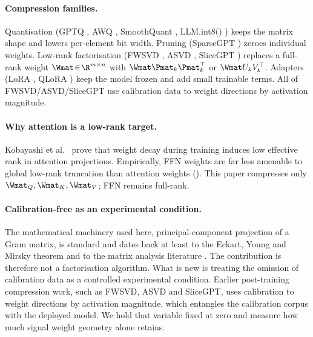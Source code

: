 \documentclass[11pt]{article}
\begin{document}
\paragraph{Compression families.}
Quantisation (GPTQ \cite{frantar2022gptq}, AWQ \cite{lin2023awq},
SmoothQuant \cite{xiao2022smoothquant}, LLM.int8() \cite{dettmers2022llmint8})
keeps the matrix shape and lowers per-element bit width.  Pruning
(SparseGPT \cite{frantar2023sparsegpt}) zeroes individual weights.
Low-rank factorisation (FWSVD \cite{hsu2022fwsvd}, ASVD
\cite{yuan2023asvd}, SliceGPT \cite{ashkboos2024slicegpt}) replaces a
full-rank weight $\Wmat\!\in\!\R^{m\times n}$ with $\Wmat\Pmat_k\Pmat_k^\top$
or $\Wmat U_kV_k^\top$.  Adapters (LoRA \cite{hu2021lora},
QLoRA \cite{dettmers2023qlora}) keep the model frozen and add small
trainable terms.  All of FWSVD/ASVD/SliceGPT use calibration data to
weight directions by activation magnitude.

\paragraph{Why attention is a low-rank target.}
Kobayashi et al.\ \cite{kobayashi2024lowrankattn} prove that weight decay
during training induces low effective rank in attention projections.
Empirically, FFN weights are far less amenable to global low-rank truncation
than attention weights ().  This paper compresses only
$\Wmat_Q,\Wmat_K,\Wmat_V$; FFN remains full-rank.

\paragraph{Calibration-free as an experimental condition.}
The mathematical machinery used here, principal-component projection of a
Gram matrix, is standard and dates back at least to the
Eckart, Young and Mirsky theorem \cite{eckart1936} and to the matrix
analysis literature \cite{trefethen1997nla,golub2013matrix}. The
contribution is therefore not a factorisation algorithm. What is new is
treating the omission of calibration data as a controlled experimental
condition. Earlier post-training compression work, such as FWSVD, ASVD and
SliceGPT, uses calibration to weight directions by activation magnitude,
which entangles the calibration corpus with the deployed model. We hold
that variable fixed at zero and measure how much signal weight geometry
alone retains.
\end{document}
